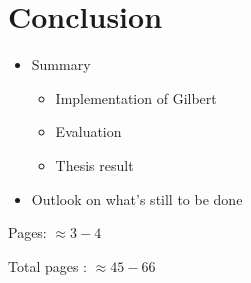 \chapter{Conclusion}
\label{cha:conclusion}

\begin{itemize}
	\item Summary
	\begin{itemize}
		\item Implementation of Gilbert
		\item Evaluation
		\item Thesis result
	\end{itemize}
	\item Outlook on what's still to be done
\end{itemize}

Pages: $\approx 3-4$

Total pages : $\approx 45 - 66$